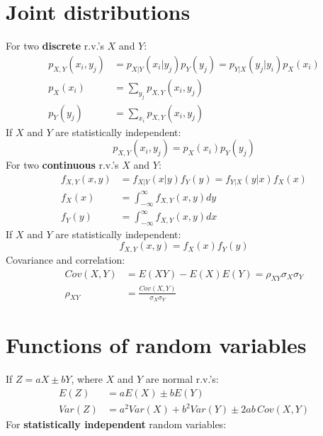 \documentclass[10pt,twoside]{article}
\newcommand{\?}{\stackrel{?}{=}}
\newcommand{\fr}{\frac}
\begin{document}
\section{Joint distributions}
For two \textbf{discrete} r.v.'s $X$ and $Y$:
\begin{align}
  p_{X,Y}(x_i,y_j)   &=  p_{X|Y}(x_i|y_j) p_Y(y_j)  =   p_{Y|X}(y_j|y_i)p_X(x_i) \\
  p_X(x_i) &= \sum_{y_j}p_{X,Y}(x_i,y_j)  \\
  p_Y(y_j) &= \sum_{x_i}p_{X,Y}(x_i,y_j)  
\end{align}
If $X$ and $Y$ are statistically independent:
\begin{equation}
  \label{eq:50a}
   p_{X,Y}(x_i,y_j)  = p_X(x_i)p_Y(y_j)
\end{equation}
For two \textbf{continuous} r.v.'s $X$ and $Y$:
\begin{align}
  f_{X,Y}(x,y) &= f_{X|Y}(x|y)f_Y(y) = f_{Y|X}(y|x)f_X(x)\\
     f_X(x) &= \int_{-\infty}^\infty f_{X,Y}(x,y)dy \\ 
  f_Y(y) &=  \int_{-\infty}^\infty f_{X,Y}(x,y)dx
\end{align}
If $X$ and $Y$ are statistically independent:
\begin{equation}
  \label{eq:50}
  f_{X,Y}(x,y) = f_X(x) f_Y(y)
\end{equation}
Covariance and correlation:
\begin{align}
  Cov(X,Y) &= E(XY) - E(X)E(Y) = \rho_{XY}\sigma_X\sigma_Y\\
  \rho_{XY} &= \fr{Cov(X,Y)}{\sigma_X\sigma_Y}
\end{align}

\eject
\section{Functions of random variables}
If $Z = aX \pm bY$, where $X$ and $Y$ are normal r.v.'s:
\begin{align}
  E(Z) &= aE(X) \pm bE(Y) \\
  Var(Z) &= a^2Var(X) + b^2Var(Y) \pm 2ab\,Cov(X,Y)
\end{align}
For \textbf{statistically independent} random variables:\\
\end{document}
